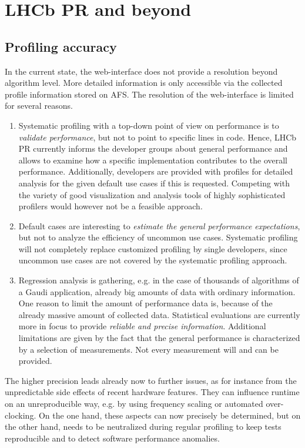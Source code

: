 \documentclass[a4paper]{jpconf}
\begin{document}
\section{LHCb PR and beyond}
\label{sec:lhcbpr_and_beyond}

\subsection{Profiling accuracy}
\label{sec:profiling accuracy}

In the current state, the web-interface does not provide a resolution beyond algorithm level. More detailed information is only accessible via the collected profile information stored on AFS. The resolution of the web-interface is limited for several reasons.
\begin{enumerate}
 \item Systematic profiling with a top-down point of view on performance is to \textit{validate performance}, but not to point to specific lines in code. Hence, LHCb PR currently informs the developer groups about general performance and allows to examine how a specific implementation contributes to the overall performance. Additionally, developers are provided with profiles for detailed analysis for the given default use cases if this is requested. Competing with the variety of good visualization and analysis tools of highly sophisticated profilers would however not be a feasible approach.
 \item Default cases are interesting to \textit{estimate the general performance expectations}, but not to analyze the efficiency of uncommon use cases. Systematic profiling will not completely replace customized profiling by single developers, since uncommon use cases are not covered by the systematic profiling approach.
 \item Regression analysis is gathering, e.g. in the case of thousands of algorithms of a Gaudi application, already big amounts of data with ordinary information. One reason to limit the amount of performance data is, because of the already massive amount of collected data. Statistical evaluations are currently more in focus to provide \textit{reliable and precise information}. Additional limitations are given by the fact that the general performance is characterized by a selection of measurements. Not every measurement will and can be provided.
\end{enumerate}
The higher precision leads already now to further issues, as for instance from the unpredictable side effects of recent hardware features. They can influence runtime on an unreproducible way, e.g. by using frequency scaling or automated over-clocking. On the one hand, these aspects can now precisely be determined, but on the other hand, needs to be neutralized during regular profiling to keep tests reproducible and to detect software performance anomalies.
\end{document}
